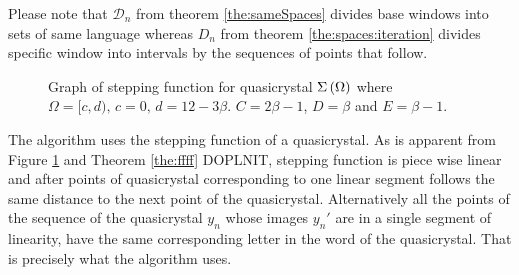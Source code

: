 \documentclass[text.tex]{subfiles}
\begin{document}
\begin{remark}
Please note that $\mathcal{D}_n$ from theorem \ref{the:sameSpaces} divides base windows into sets of same language whereas $D_n$ from theorem \ref{the:spaces:iteration} divides specific window into intervals by the sequences of points that follow.
\end{remark}



\begin{figure}[h]
\centering
\caption{Graph of stepping function for quasicrystal $\Sigma\left(\Omega\right)$ where $\Omega = [c,d),\, c=0,\, d=12-3\beta$. $C= 2\beta-1$, $D= \beta$ and $E= \beta-1$.}
\label{img:steppingFunction}
\end{figure}

The algorithm uses the stepping function of a quasicrystal. As is apparent from Figure \ref{img:steppingFunction} and Theorem \ref{the:ffff} DOPLNIT, stepping function is piece wise linear and after points of quasicrystal corresponding to one linear segment follows the same distance to the next point of the quasicrystal. Alternatively all the points of the sequence of the quasicrystal $y_n$ whose images $y_n'$ are in a single segment of linearity, have the same corresponding letter in the word of the quasicrystal. That is precisely what the algorithm uses. 
\end{document}
